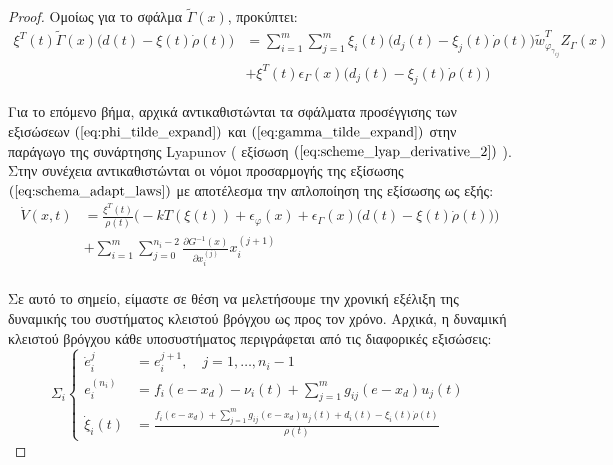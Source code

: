 \begin{proof}
Ομοίως για το σφάλμα $\tilde{\Gamma}(x)$, προκύπτει:
\begin{equation}
\begin{split}
	\xi^T(t) \tilde{\Gamma}(x) \big( d(t) - \xi(t)\dot{\rho}(t) \big) 
	&= \sum_{i=1}^{m} \sum_{j=1}^{m}
	\xi_i(t) \big( d_j(t) - \xi_j(t)\dot{\rho}(t) \big)  \tilde{w}_{\varphi_{\gamma_{ij}}}^{T} Z_{\Gamma}(x) \\
	&+\xi^T(t) \epsilon_{\Gamma}(x)  \big( d_j(t) - \xi_j(t)\dot{\rho}(t) \big)
\end{split}
\label{eq:gamma_tilde_expand}
\end{equation}

Για το επόμενο βήμα,  αρχικά αντικαθιστώνται τα σφάλματα προσέγγισης των εξισώσεων $(\ref{eq:phi_tilde_expand})$ και $(\ref{eq:gamma_tilde_expand})$ στην παράγωγο της συνάρτησης Lyapunov ( εξίσωση $(\ref{eq:scheme_lyap_derivative_2})$ ). Στην συνέχεια αντικαθιστώνται οι νόμοι προσαρμογής της εξίσωσης $(\ref{eq:schema_adapt_laws})$ με αποτέλεσμα την απλοποίηση της εξίσωσης ως εξής:
\begin{equation}
\begin{split}
\dot{V}(x,t) &= 
\frac{\xi^T(t)} {\rho(t)} \Big( -k T(\xi(t)) + \epsilon_{\varphi}(x)  
+  \epsilon_{\Gamma}(x) \big( d(t) - \xi(t)\dot{\rho}(t) \big)  \Big) \\ 
&+ \sum_{i=1}^{m} \sum_{j=0}^{n_i - 2} 
\frac{\partial G^{-1}(x) }{\partial x_i^{(j)}} x_i^{(j +1)}\\
\end{split}
\label{eq:scheme_lyap_derivative_3}
\end{equation}

Σε αυτό το σημείο, είμαστε σε θέση να μελετήσουμε την χρονική εξέλιξη της δυναμικής του συστήματος κλειστού βρόγχου ως προς τον χρόνο. Αρχικά, η δυναμική κλειστού βρόγχου κάθε υποσυστήματος περιγράφεται από τις διαφορικές εξισώσεις:
\begin{equation}
\Sigma_i \left\{ 
\begin{split}
	\dot{e}_i^{j}  &= {e}_i^{j+1}, \quad j = 1,\dots,n_i-1\\
	e_i^{(n_i)}    &= f_i(e - x_d) -\nu_i(t) + \sum_{j=1}^{m} g_{ij}(e - x_d) u_j(t) \\
	\dot{\xi}_i(t) &= \frac{f_i(e - x_d) + \sum_{j=1}^{m} g_{ij}(e - x_d) u_j(t) + d_i(t) - \xi_{i}(t) \dot{\rho}(t) }
	{\rho(t)} 
\end{split}
\right.
\end{equation}


\end{proof}
